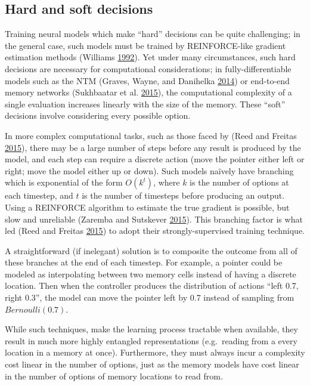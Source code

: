 \documentclass[12pt,twoside]{mitthesis}
\begin{document}
\subsection{Hard and soft decisions}\label{hard-and-soft-decisions}

Training neural models which make ``hard'' decisions can be quite
challenging; in the general case, such models must be trained by
REINFORCE-like gradient estimation methods (Williams
\protect\hyperlink{ref-williams1992simple}{1992}). Yet under many
circumstances, such hard decisions are necessary for computational
considerations; in fully-differentiable models such as the NTM (Graves,
Wayne, and Danihelka \protect\hyperlink{ref-graves2014neural}{2014}) or
end-to-end memory networks (Sukhbaatar et al.
\protect\hyperlink{ref-sukhbaatar2015end}{2015}), the computational
complexity of a single evaluation increases linearly with the size of
the memory. These ``soft'' decisions involve considering every possible
option.

In more complex computational tasks, such as those faced by (Reed and
Freitas \protect\hyperlink{ref-reed2015neural}{2015}), there may be a
large number of steps before any result is produced by the model, and
each step can require a discrete action (move the pointer either left or
right; move the model either up or down). Such models naïvely have
branching which is exponential of the form \(O(k^t)\), where \(k\) is
the number of options at each timestep, and \(t\) is the number of
timesteps before producing an output. Using a REINFORCE algorithm to
estimate the true gradient is possible, but slow and unreliable (Zaremba
and Sutskever \protect\hyperlink{ref-zaremba2015reinforcement}{2015}).
This branching factor is what led (Reed and Freitas
\protect\hyperlink{ref-reed2015neural}{2015}) to adopt their
strongly-supervised training technique.

A straightforward (if inelegant) solution is to composite the outcome
from all of these branches at the end of each timestep. For example, a
pointer could be modeled as interpolating between two memory cells
instead of having a discrete location. Then when the controller produces
the distribution of actions ``left 0.7, right 0.3'', the model can move
the pointer left by 0.7 instead of sampling from \(Bernoulli(0.7)\).

While such techniques, make the learning process tractable when
available, they result in much more highly entangled representations
(e.g.~reading from a every location in a memory at once). Furthermore,
they must always incur a complexity cost linear in the number of
options, just as the memory models have cost linear in the number of
options of memory locations to read from.
\end{document}
